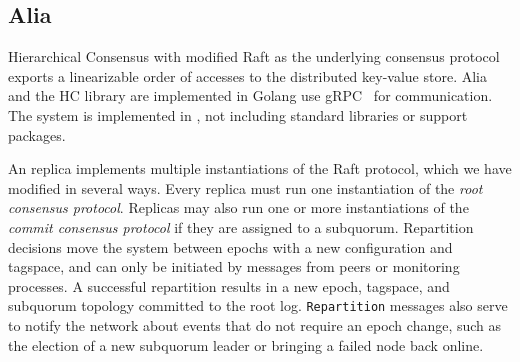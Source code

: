 \subsection{Alia}
\label{ch05_alia}

Hierarchical Consensus with modified Raft as the underlying consensus
protocol exports a linearizable order of accesses to the distributed key-value
store.
Alia and the HC library are implemented in Golang use gRPC~\cite{grpc} for
communication.
The system is implemented in , not including standard
libraries or support packages.

An  replica implements multiple instantiations of the Raft protocol, which we have modified in several ways.
Every replica must run one instantiation of the \textit{root consensus protocol}.
Replicas may also run one or more instantiations of the \textit{commit consensus protocol} if they are assigned to a subquorum.
Repartition decisions move the system between epochs with a new configuration and tagspace, and can only be initiated by messages from peers or monitoring processes.
A successful repartition results in a new epoch, tagspace, and subquorum topology committed to the root log.
\texttt{Repartition} messages also serve to notify the network about events that do not require an epoch change, such as the election of a new subquorum leader or bringing a failed node back online.

